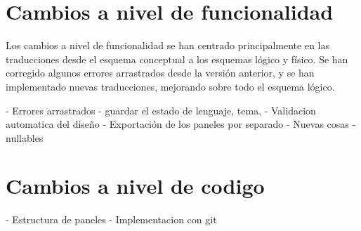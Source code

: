 \section{Cambios a nivel de funcionalidad}
Los cambios a nivel de funcionalidad se han centrado principalmente en las traducciones desde el esquema conceptual a los esquemas lógico y físico. Se han corregido algunos errores arrastrados desde la versión anterior, y se han implementado nuevas traducciones, mejorando sobre todo el esquema lógico.

- Errores arrastrados
- guardar el estado de lenguaje, tema,
- Validacion automatica del diseño
- Exportación de los paneles por separado
- Nuevas cosas
- nullables

\section{Cambios a nivel de codigo}
- Estructura de paneles
- Implementacion con git